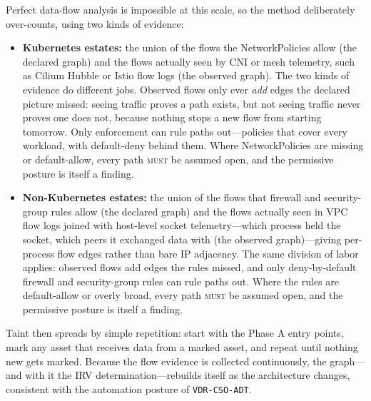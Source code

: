 \documentclass[11pt]{article}
\newcommand{\code}[1]{\texttt{#1}}
\newcommand{\rfckw}[1]{\textsc{#1}}
\begin{document}
Perfect data-flow analysis is impossible at this scale, so the method deliberately over-counts, using two kinds of evidence:
\begin{itemize}[leftmargin=1.5em]
\item \textbf{Kubernetes estates:} the union of the flows the NetworkPolicies allow (the declared graph) and the flows actually seen by CNI or mesh telemetry, such as Cilium Hubble or Istio flow logs (the observed graph). The two kinds of evidence do different jobs. Observed flows only ever \emph{add} edges the declared picture missed: seeing traffic proves a path exists, but not seeing traffic never proves one does not, because nothing stops a new flow from starting tomorrow. Only enforcement can rule paths out---policies that cover every workload, with default-deny behind them. Where NetworkPolicies are missing or default-allow, every path \rfckw{must} be assumed open, and the permissive posture is itself a finding.
\item \textbf{Non-Kubernetes estates:} the union of the flows that firewall and security-group rules allow (the declared graph) and the flows actually seen in VPC flow logs joined with host-level socket telemetry---which process held the socket, which peers it exchanged data with (the observed graph)---giving per-process flow edges rather than bare IP adjacency. The same division of labor applies: observed flows add edges the rules missed, and only deny-by-default firewall and security-group rules can rule paths out. Where the rules are default-allow or overly broad, every path \rfckw{must} be assumed open, and the permissive posture is itself a finding.
\end{itemize}
Taint then spreads by simple repetition: start with the Phase A entry points, mark any asset that receives data from a marked asset, and repeat until nothing new gets marked. Because the flow evidence is collected continuously, the graph---and with it the IRV determination---rebuilds itself as the architecture changes, consistent with the automation posture of \code{VDR-CSO-ADT}.
\end{document}
